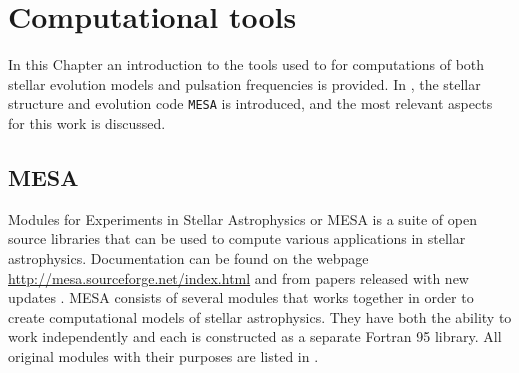 \chapter{Computational tools}
\label{compute}
In this Chapter an introduction to the tools used to for computations of both stellar evolution models and pulsation frequencies is provided. In , the stellar structure and evolution code \texttt{MESA} is introduced, and the most relevant aspects for this work is discussed.  

\section{MESA}
\label{sec:mesa}

Modules for Experiments in Stellar Astrophysics or MESA is a suite of open source libraries that can be used to compute various applications in stellar astrophysics. Documentation can be found on the webpage \url{http://mesa.sourceforge.net/index.html} and from papers released with new updates \citep{paxton2010, paxton2013modules, paxton2015modules, paxton2018modules, paxton2019modules}.
MESA consists of several modules that works together in order to create computational models of stellar astrophysics. They have both the ability to work independently and each is constructed as a separate Fortran 95 library. All original modules \citep{paxton2010} with their purposes are listed in . 


